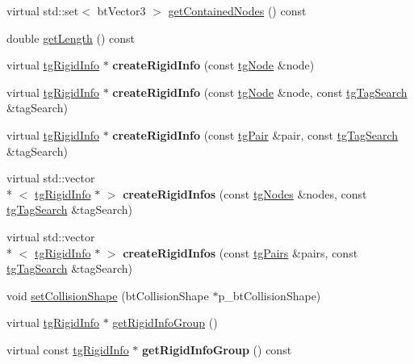\begin{DoxyCompactItemize}
\item 
virtual std\-::set$<$ bt\-Vector3 $>$ \hyperlink{classtg_rod_info_a5f180833f6936b33001e5ed082bf7876}{get\-Contained\-Nodes} () const 
\item 
double \hyperlink{classtg_rod_info_a542f8514e22cb4bf1448b4206db2cc0d}{get\-Length} () const 
\item 
\hypertarget{classtg_rigid_info_a5d2a96b8148b75b8bb71640c74e355cb}{virtual \hyperlink{classtg_rigid_info}{tg\-Rigid\-Info} $\ast$ {\bfseries create\-Rigid\-Info} (const \hyperlink{classtg_node}{tg\-Node} \&node)}\label{classtg_rigid_info_a5d2a96b8148b75b8bb71640c74e355cb}

\item 
\hypertarget{classtg_rigid_info_a06b02534af62fa7c935accf8321a4c8f}{virtual \hyperlink{classtg_rigid_info}{tg\-Rigid\-Info} $\ast$ {\bfseries create\-Rigid\-Info} (const \hyperlink{classtg_node}{tg\-Node} \&node, const \hyperlink{classtg_tag_search}{tg\-Tag\-Search} \&tag\-Search)}\label{classtg_rigid_info_a06b02534af62fa7c935accf8321a4c8f}

\item 
\hypertarget{classtg_rigid_info_aec3117ed1b4e6561930fa2709805073e}{virtual \hyperlink{classtg_rigid_info}{tg\-Rigid\-Info} $\ast$ {\bfseries create\-Rigid\-Info} (const \hyperlink{classtg_pair}{tg\-Pair} \&pair, const \hyperlink{classtg_tag_search}{tg\-Tag\-Search} \&tag\-Search)}\label{classtg_rigid_info_aec3117ed1b4e6561930fa2709805073e}

\item 
\hypertarget{classtg_rigid_info_a54605e906e00a814e1494375602e02ee}{virtual std\-::vector\\*
$<$ \hyperlink{classtg_rigid_info}{tg\-Rigid\-Info} $\ast$ $>$ {\bfseries create\-Rigid\-Infos} (const \hyperlink{classtg_nodes}{tg\-Nodes} \&nodes, const \hyperlink{classtg_tag_search}{tg\-Tag\-Search} \&tag\-Search)}\label{classtg_rigid_info_a54605e906e00a814e1494375602e02ee}

\item 
\hypertarget{classtg_rigid_info_a3707c0ddac713beb6287525765f9bd02}{virtual std\-::vector\\*
$<$ \hyperlink{classtg_rigid_info}{tg\-Rigid\-Info} $\ast$ $>$ {\bfseries create\-Rigid\-Infos} (const \hyperlink{classtg_pairs}{tg\-Pairs} \&pairs, const \hyperlink{classtg_tag_search}{tg\-Tag\-Search} \&tag\-Search)}\label{classtg_rigid_info_a3707c0ddac713beb6287525765f9bd02}

\item 
void \hyperlink{classtg_rigid_info_a8b6d9ed5609dad929593f6f7f82d3f92}{set\-Collision\-Shape} (bt\-Collision\-Shape $\ast$p\-\_\-bt\-Collision\-Shape)
\item 
virtual \hyperlink{classtg_rigid_info}{tg\-Rigid\-Info} $\ast$ \hyperlink{classtg_rigid_info_a1a0d5dcdb3794c8772abd8d93a646e54}{get\-Rigid\-Info\-Group} ()
\item 
\hypertarget{classtg_rigid_info_aded8e887331027bee5ef4b64b44f455b}{virtual const \hyperlink{classtg_rigid_info}{tg\-Rigid\-Info} $\ast$ {\bfseries get\-Rigid\-Info\-Group} () const }\label{classtg_rigid_info_aded8e887331027bee5ef4b64b44f455b}


\end{DoxyCompactItemize}
